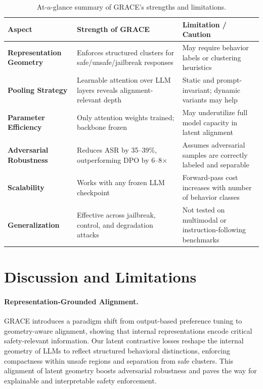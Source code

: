 
\vspace{2mm}
\begin{table}[ht!]
\centering
\small
\begin{tabular}{p{4.2cm} p{5.8cm} p{5.8cm}}
\toprule
\textbf{Aspect} & \textbf{Strength of GRACE} & \textbf{Limitation / Caution} \\
\midrule
\textbf{Representation Geometry} & Enforces structured clusters for safe/unsafe/jailbreak responses & May require behavior labels or clustering heuristics \\
\textbf{Pooling Strategy} & Learnable attention over LLM layers reveals alignment-relevant depth & Static and prompt-invariant; dynamic variants may help \\
\textbf{Parameter Efficiency} & Only attention weights trained; backbone frozen & May underutilize full model capacity in latent alignment \\
\textbf{Adversarial Robustness} & Reduces ASR by 35–39\%, outperforming DPO by 6–8$\times$ & Assumes adversarial samples are correctly labeled and separable \\
\textbf{Scalability} & Works with any frozen LLM checkpoint & Forward-pass cost increases with number of behavior classes \\
\textbf{Generalization} & Effective across jailbreak, control, and degradation attacks & Not tested on multimodal or instruction-following benchmarks \\
\bottomrule
\end{tabular}
\caption{At-a-glance summary of GRACE’s strengths and limitations.}
\label{tab:grace_summary}
\vspace{-1mm}
\end{table}

\section{Discussion and Limitations}

\paragraph{Representation-Grounded Alignment.}
GRACE introduces a paradigm shift from output-based preference tuning to geometry-aware alignment, showing that internal representations encode critical safety-relevant information. Our latent contrastive losses reshape the internal geometry of LLMs to reflect structured behavioral distinctions, enforcing compactness within unsafe regions and separation from safe clusters. This alignment of latent geometry boosts adversarial robustness and paves the way for explainable and interpretable safety enforcement.


